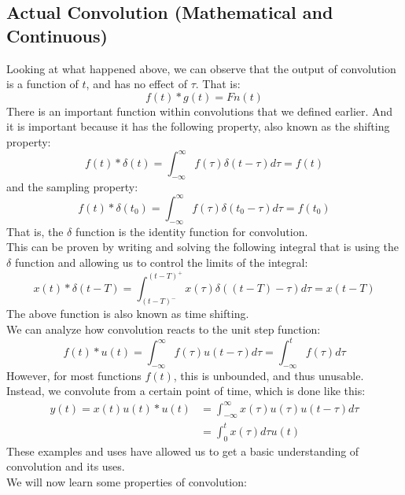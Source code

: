 \documentclass[nobib]{tufte-handout}
\begin{document}
\subsection{Actual Convolution (Mathematical and Continuous)}
Looking at what happened above, we can observe that the output of convolution
is a function of $t$, and has no effect of $\tau$. That is:
\begin{equation*}
    f(t)*g(t) = Fn(t)
\end{equation*}
There is an important function within convolutions that we defined earlier. And it is important because it has the following property, also known as the shifting property:
\begin{equation*}
    f(t)*\delta(t) = \int_{-\infty}^{\infty} f(\tau)\delta(t-\tau)d\tau = f(t)
\end{equation*}
and the sampling property:
\begin{equation*}
    f(t)*\delta(t_0) = \int_{-\infty}^{\infty} f(\tau)\delta(t_0-\tau)d\tau = f(t_0)
\end{equation*}
That is, the $\delta$ function is the identity function for convolution.\\
This can be proven by writing and solving the following integral that is using the $\delta$ function and allowing us to control the limits of the integral:
\begin{equation*}
    x(t)*\delta(t-T) = \int_{(t-T)^-}^{(t-T)^+}x(\tau)\delta((t-T)-\tau)d\tau = x(t-T)
\end{equation*}
The above function is also known as time shifting.\\
We can analyze how convolution reacts to the unit step function:
\begin{equation*}
    f(t)*u(t) = \int_{-\infty}^{\infty} f(\tau)u(t-\tau)d\tau = \int_{-\infty}^{t} f(\tau)d\tau
\end{equation*}
However, for most functions $f(t)$, this is unbounded, and thus unusable. Instead, we convolute from a certain point of time, which is done like this:
\begin{align*}
    y(t)=x(t)u(t)*u(t) & = \int_{-\infty}^{\infty} x(\tau)u(\tau)u(t-\tau)d\tau \\
                       & = \int_{0}^{t}x(\tau)d\tau u(t)
\end{align*}
These examples and uses have allowed us to get a basic understanding of convolution and its uses.\\
We will now learn some properties of convolution:
\end{document}
